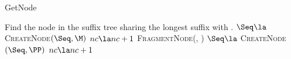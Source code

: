     


%		
%		
	
%	

\begin{algorithm}
	\caption{GetNode} \label{alg:getnode}
	\begin{algorithmic}[1]
	    
		\State Find the node \M \space in the suffix tree sharing the longest suffix with \Seq.
			\If{$\Seq = \M$}
				\State \Return \M
			\Else
				\State $\Seq \la$ \textsc{CreateNode}$(\Seq, \M)$
				\State $nc \la nc + 1$
				\State \Return \Seq
			\EndIf
		\Else
			\State \PP \la \space \textsc{FragmentNode}(\M, \Seq)
			\State $\Seq \la $ \textsc{CreateNode}$(\Seq, \PP)$
			\State $nc \la nc + 1$
			\State \Return \Seq
		\EndIf
	\EndFunction
	
	\end{algorithmic}
\end{algorithm}

